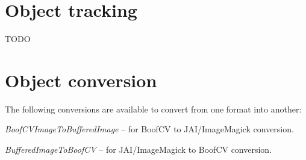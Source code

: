 \documentclass[a4paper]{book}
\begin{document}
\chapter{Object tracking}
TODO


\chapter{Object conversion}
The following conversions are available to convert from one
format into another:
\begin{tight_itemize}
	\item \textit{BoofCVImageToBufferedImage} -- for BoofCV to JAI/ImageMagick
	conversion.
	\item \textit{BufferedImageToBoofCV} -- for JAI/ImageMagick to BoofCV
	conversion.
\end{tight_itemize}



\end{document}
